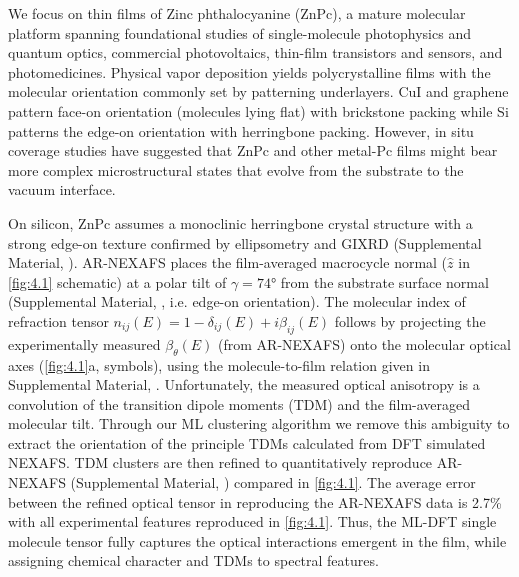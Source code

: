 We focus on thin films of Zinc phthalocyanine (ZnPc), a mature molecular platform spanning foundational studies of single-molecule photophysics and quantum optics\autocite{yangSubnanometreResolutionSinglemolecule2020,zhangVisualizingCoherentIntermolecular2016,luoElectricallyDrivenSinglePhoton2019,caoEnergyFunnellingMultichromophore2021,doppagneElectrofluorochromismSinglemoleculeLevel2018}, commercial photovoltaics\autocite{klenklerPhotovoltaicDevice2015,pfeifferOrganicPhotoactiveDevice2013}, thin-film transistors and sensors\autocite{boileauMetalPhthalocyanineOrganic2019,comeauSurfaceEngineeringZinc2022}, and photomedicines.\autocite{PhthalocyaninesConjugatedSmall,rakAdvancesLiposomeEncapsulatedPhthalocyanines2023,luoNanoscaleMetalOrganic2021} Physical vapor deposition yields polycrystalline films with the molecular orientation commonly set by patterning underlayers. CuI and graphene pattern face-on orientation (molecules lying flat) with brickstone packing while Si patterns the edge-on orientation with herringbone packing\autocite{katoMorphologicalOpticalProperties2020a,ngongangndjawaImpactMolecularOrientation2015,schunemannZincPhthalocyanineInfluence2011}. However, in situ coverage studies have suggested that ZnPc and other metal-Pc films might bear more complex microstructural states that evolve from the substrate to the vacuum interface.\autocite{derrienInterfacialRearrangementsStrain2022,yangMolecularOrientationInducedRapidRoughening2015,yamamotoVariationZincPhthalocyanine2022,deoteyzaStructuralRearrangementsInitial2006,ossoStructureMorphologyOptical2004}

On silicon, ZnPc assumes a monoclinic herringbone crystal structure\autocite{schunemannZincPhthalocyanineInfluence2011,derrienInterfacialRearrangementsStrain2022} with a strong edge-on texture confirmed by ellipsometry and GIXRD (Supplemental Material, ). AR-NEXAFS places the film-averaged macrocycle normal (\(\widehat{z}\) in \cref{fig:4.1} schematic) at a polar tilt of \(\gamma = \ang{74}\) from the substrate surface normal (Supplemental Material, , i.e. edge-on orientation). The molecular index of refraction tensor \(n_{ij}(E) = 1 - \delta_{ij}(E) + i\beta_{ij}(E)\) follows by projecting the experimentally measured \(\beta_{\theta}(E)\) (from AR-NEXAFS) onto the molecular optical axes (\cref{fig:4.1}a, symbols)\autocite{stohrNEXAFSSpectroscopy1992,collinsPolarizedXrayScattering2012}, using the molecule-to-film relation given in Supplemental Material, . Unfortunately, the measured optical anisotropy is a convolution of the transition dipole moments (TDM) and the film-averaged molecular tilt. Through our ML clustering algorithm we remove this ambiguity to extract the orientation of the principle TDMs calculated from DFT simulated NEXAFS.\autocite{murciaQuantitativeBondTraceableResonant2026} TDM clusters are then refined to quantitatively reproduce AR-NEXAFS (Supplemental Material, ) compared in \cref{fig:4.1}. The average error between the refined optical tensor in reproducing the AR-NEXAFS data is 2.7\% with all experimental features reproduced in \cref{fig:4.1}. Thus, the ML-DFT single molecule tensor fully captures the optical interactions emergent in the film, while assigning chemical character and TDMs to spectral features.

